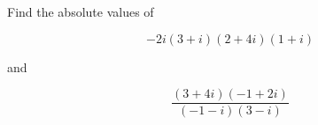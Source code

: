Find the absolute values of

$$-2i(3+i)(2+4i)(1+i)$$

and

$$\frac{(3+4i)(-1+2i)}{(-1-i)(3-i)}$$

\begin{solution}\renewcommand{\qedsymbol}{}\ \\

    

\end{solution}